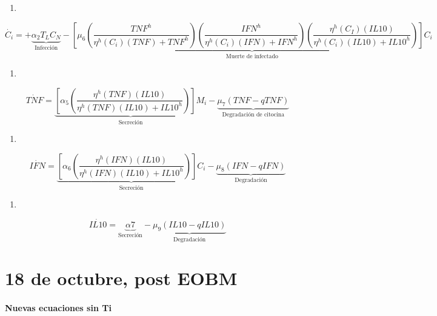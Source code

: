 \documentclass[
]{article}
\providecommand{\tightlist}{%
  \setlength{\itemsep}{0pt}\setlength{\parskip}{0pt}}
\begin{document}
\begin{enumerate}
\def\labelenumi{\arabic{enumi}.}
\setcounter{enumi}{5}
\tightlist
\item
\end{enumerate}

\[ \dot{C_{i}}= + \underbrace{\alpha_{2}T_{L}C_{N}}_{\text{Infección}}-\underbrace{ [\mu_{6}(\dfrac{TNF^{h}}{\eta^{h}(C_{i})(TNF)+TNF^{h}})(\dfrac{IFN^{h}}{\eta^{h}(C_{i})(IFN)+IFN^{h}})(\dfrac{\eta^{h}(C_{I})(IL10)}{\eta^{h}(C_{i})(IL10)+IL10^{h}})]C_{i}}_{\text{Muerte de infectado}} \]

\begin{enumerate}
\def\labelenumi{\arabic{enumi}.}
\setcounter{enumi}{6}
\tightlist
\item
\end{enumerate}

\[\dot{TNF}= \underbrace{[\alpha_{5}(\dfrac{\eta^{h}(TNF)(IL10)}{\eta^{h}(TNF)(IL10)+IL10^{h}})]M_{i}}_{\text{Secreción}} -\underbrace{\mu_{7}(TNF -qTNF)}_{\text{Degradación de citocina}}\]

\begin{enumerate}
\def\labelenumi{\arabic{enumi}.}
\setcounter{enumi}{7}
\tightlist
\item
\end{enumerate}

\[ \dot{IFN}=  \underbrace{[\alpha_{6}(\dfrac{\eta^{h}(IFN)(IL10)}{\eta^{h}(IFN)(IL10)+IL10^{h}})]C_{i}}_{\text{Secreción}}-\underbrace{\mu_{8}(IFN-qIFN)}_{\text{Degradación}} \]

\begin{enumerate}
\def\labelenumi{\arabic{enumi}.}
\setcounter{enumi}{8}
\tightlist
\item
\end{enumerate}

\[ \dot{IL10}= \underbrace{\alpha{7}}_{\text{Secreción}}-\underbrace{\mu_{9}(IL10-qIL10)}_{\text{Degradación}} \]

\hypertarget{de-octubre-post-eobm}{%
\section{18 de octubre, post EOBM}\label{de-octubre-post-eobm}}

\hypertarget{nuevas-ecuaciones-sin-ti}{%
\paragraph{Nuevas ecuaciones sin Ti}\label{nuevas-ecuaciones-sin-ti}}
\end{document}
